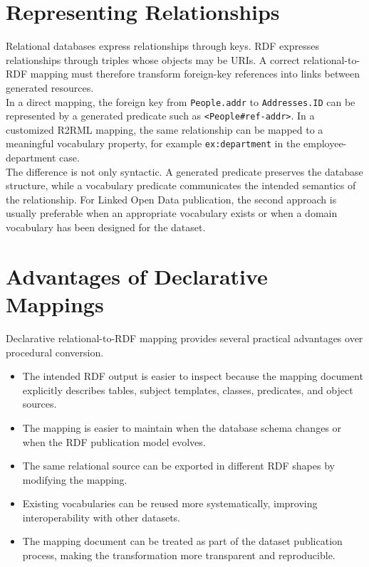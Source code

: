 \documentclass{scrbook}
\begin{document}
	\section{Representing Relationships}
	
	Relational databases express relationships through keys. RDF expresses relationships through triples whose objects may be URIs. A correct relational-to-RDF mapping must therefore transform foreign-key references into links between generated resources.\\
	
	In a direct mapping, the foreign key from \texttt{People.addr} to \texttt{Addresses.ID} can be represented by a generated predicate such as \texttt{<People\#ref-addr>}. In a customized R2RML mapping, the same relationship can be mapped to a meaningful vocabulary property, for example \texttt{ex:department} in the employee-department case.\\
	
	The difference is not only syntactic. A generated predicate preserves the database structure, while a vocabulary predicate communicates the intended semantics of the relationship. For Linked Open Data publication, the second approach is usually preferable when an appropriate vocabulary exists or when a domain vocabulary has been designed for the dataset.
	
	\section{Advantages of Declarative Mappings}
	
	Declarative relational-to-RDF mapping provides several practical advantages over procedural conversion.
	
	\begin{itemize}
	    \item The intended RDF output is easier to inspect because the mapping document explicitly describes tables, subject templates, classes, predicates, and object sources.
	    \item The mapping is easier to maintain when the database schema changes or when the RDF publication model evolves.
	    \item The same relational source can be exported in different RDF shapes by modifying the mapping.
	    \item Existing vocabularies can be reused more systematically, improving interoperability with other datasets.
	    \item The mapping document can be treated as part of the dataset publication process, making the transformation more transparent and reproducible.
	\end{itemize}
	
\end{document}
